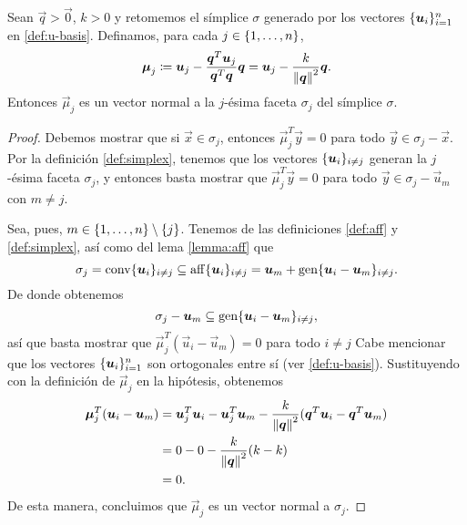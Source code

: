 \begin{lemma}
	\label{mu:orth}
	Sean $\vec{q} > \vec{0}$, $k > 0$ y retomemos el símplice $\sigma$ generado por los vectores
	$\lbrace \boldsymbol{u}_i \rbrace_{i=1}^{n}$ en \eqref{def:u-basis}. Definamos, para cada $j \in \lbrace 1,
	\ldots, n \rbrace$,
	\begin{equation}
		\label{eq:normal}
		\boldsymbol{\mu}_j \coloneq \boldsymbol{u}_j - \frac{\boldsymbol{q}^T\boldsymbol{u}_j}{\boldsymbol{q}^T\boldsymbol{q}}\boldsymbol{q}
		= \boldsymbol{u}_j - \frac{k}{\left\lVert \boldsymbol{q} \right\rVert^2}\boldsymbol{q}.
	\end{equation}
	Entonces $\vec{\mu}_j$ es un vector normal a la $j$-ésima faceta $\sigma_j$ del símplice
	$\sigma$.
\end{lemma}
\begin{proof}
	Debemos mostrar que si $\vec{x} \in \sigma_j$, entonces $\vec{\mu}_j^T\vec{y} = 0$ para todo
	$\vec{y} \in \sigma_j - \vec{x}$. Por la definición \ref{def:simplex}, tenemos que los vectores
	$\lbrace \boldsymbol{u}_i \rbrace_{i \neq j}$ generan la $j$-ésima faceta $\sigma_j$, y entonces basta mostrar
	que $\vec{\mu}_j^T\vec{y} = 0$ para todo $\vec{y} \in \sigma_j - \vec{u}_m$ con $m \neq j$.

	Sea, pues, $m \in \lbrace 1, \ldots, n \rbrace \setminus \lbrace j \rbrace$. Tenemos de las definiciones
	\ref{def:aff} y \ref{def:simplex}, así como del lema \ref{lemma:aff} que
	\begin{equation*}
		\sigma_j = \operatorname{conv}\lbrace \boldsymbol{u}_i \rbrace_{i \neq j} \subseteq
		\operatorname{aff}\lbrace \boldsymbol{u}_i \rbrace_{i \neq j}
		= \boldsymbol{u}_m + \operatorname{gen}\lbrace \boldsymbol{u}_i - \boldsymbol{u}_m \rbrace_{i \neq j}.
	\end{equation*}
	De donde obtenemos
	\begin{equation*}
		\sigma_j - \boldsymbol{u}_m \subseteq \operatorname{gen}\lbrace \boldsymbol{u}_i - \boldsymbol{u}_m \rbrace_{i \neq j},
	\end{equation*}
	así que basta mostrar que $\vec{\mu}_j^T(\vec{u}_i - \vec{u}_m) = 0$ para todo $i \neq j$ Cabe
	mencionar que los vectores $\lbrace \boldsymbol{u}_i \rbrace_{i=1}^{n}$ son ortogonales entre sí (ver
	\eqref{def:u-basis}). Sustituyendo con la definición de $\vec{\mu}_j$ en la hipótesis, obtenemos
	\begin{align*}
		\boldsymbol{\mu}_j^T(\boldsymbol{u}_i - \boldsymbol{u}_m)
		&=
		\boldsymbol{u}_j^T\boldsymbol{u}_i - \boldsymbol{u}_j^T\boldsymbol{u}_m - \frac{k}{\left\lVert \boldsymbol{q} \right\rVert^2}(\boldsymbol{q}^T\boldsymbol{u}_i
		- \boldsymbol{q}^T\boldsymbol{u}_m) \\
		&= 0 - 0 -\frac{k}{\left\lVert \boldsymbol{q} \right\rVert^2}(k - k) \\
		&= 0.
	\end{align*}
	De esta manera, concluimos que $\vec{\mu}_j$ es un vector normal a $\sigma_j$.
\end{proof}


